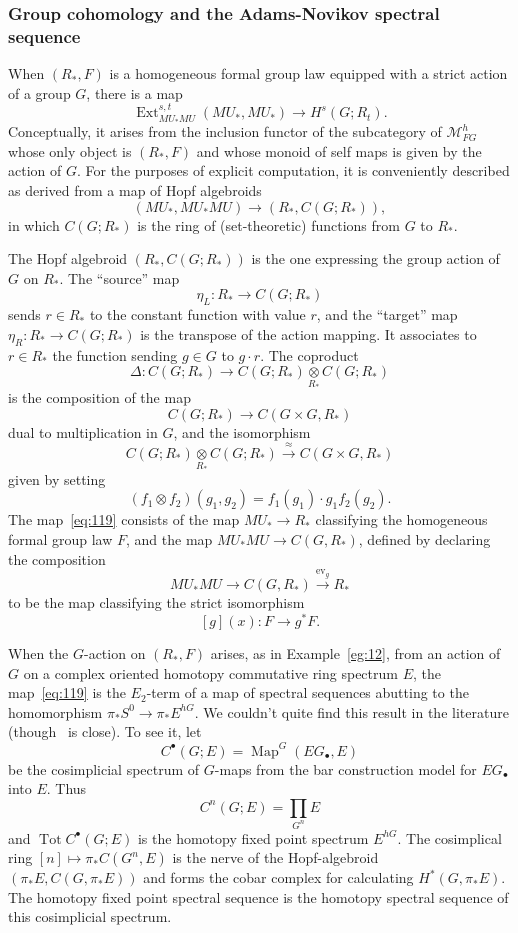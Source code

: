 \documentclass{amsart}
\theoremstyle{definition}
\theoremstyle{remark}
\newcommand{\ext}{\operatorname{Ext}}
\DeclareMathOperator{\map}{Map}
\DeclareMathOperator{\ev}{ev}
\newcommand{\mustarmu}{MU_{\ast}MU}
\newcommand{\mustar}{MU_{\ast}}
\newcommand{\mfgh}{\mathcal{M}_{FG}^{h}}
\DeclareMathOperator{\tot}{Tot}
\begin{document}
\subsubsection{Group cohomology and the Adams-Novikov spectral
sequence}
\label{sec:group-cohom-adams}
When $(R_{\ast},F)$ is a homogeneous formal group law equipped with a
strict action of a group $G$, there is a map
\[
\ext^{s,t}_{\mustarmu}(\mustar,\mustar) \to H^{s}(G;R_{t}).
\]
Conceptually, it arises from the inclusion functor of the subcategory
of $\mfgh$ whose only object is $(R_{\ast},F)$ and whose monoid of
self maps is given by the action of $G$.  For the purposes of explicit
computation, it is  conveniently described as derived from a map of
Hopf algebroids
\begin{equation}
\label{eq:119}
(\mustar,\mustarmu) \to (R_{\ast}, C(G;R_{\ast})),
\end{equation}
in which $C(G;R_{\ast})$ is the ring of (set-theoretic) functions from
$G$ to $R_{\ast}$. 

The Hopf algebroid $(R_{\ast}, C(G;R_{\ast}))$ is the one expressing
the group action of $G$ on $R_{\ast}$.  The ``source'' map
\[
\eta_{L}:R_{\ast}\to C(G;R_{\ast})
\]
sends $r\in R_{\ast}$ to the constant function with value $r$, and the
``target'' map $\eta_{R}:R_{\ast}\to C(G;R_{\ast})$ is the transpose
of the action mapping.  It associates to $r\in R_{\ast}$ the function
sending $g\in G$ to $g\cdot r$.  The coproduct
\[
\Delta:C(G;R_{\ast}) \to C(G;R_{\ast})\underset{R_{\ast}}{\otimes}
C(G;R_{\ast})
\]
is the composition of the map
\[
C(G;R_{\ast})\to C(G\times G,R_{\ast})
\]
dual to multiplication in $G$, and the isomorphism
\[
C(G;R_{\ast})\underset{R_{\ast}}{\otimes} C(G;R_{\ast}) 
\xrightarrow{\approx}{} C(G\times G,R_{\ast}) 
\]
given by setting
\[
(f_{1}\otimes f_{2})(g_{1},g_{2}) =f_{1}(g_{1})\cdot g_{1}f_{2}(g_{2}).
\]
The map~\eqref{eq:119} consists of the map $\mustar\to R_{\ast}$
classifying the homogeneous formal group law $F$, and the map
$\mustarmu\to C(G,R_{\ast})$, defined by declaring the composition
\[
\mustarmu\to C(G,R_{\ast})\xrightarrow{\ev_{g}}{} R_{\ast}
\]
to be the map classifying the strict isomorphism 
\[
[g](x):F\to g^{\ast}F.
\]

When the $G$-action on $(R_{\ast}, F)$ arises, as in
Example~\ref{eg:12}, from an action of $G$ on a complex oriented
homotopy commutative ring spectrum $E$, the map~\eqref{eq:119} is the
$E_{2}$-term of a map of spectral sequences abutting to the
homomorphism $\pi_{\ast}S^{0}\to \pi_{\ast}E^{hG}$.  We couldn't quite
find this result in the literature
(though~\cite[Proposition~6.7]{devinatz04:_homot_morav} is close).  To
see it, let
\[
C^{\bullet}(G;E) = \map^{G}(EG_{\bullet},E)
\]
be the cosimplicial spectrum of $G$-maps from the bar construction
model for $EG_{\bullet}$ into $E$.  Thus
\[
C^{n}(G;E) = \prod_{G^{n}}E
\]
and $\tot C^{\bullet}(G;E)$ is the homotopy fixed point spectrum
$E^{hG}$.  The cosimplical ring $[n]\mapsto \pi_{\ast}C(G^{n},E)$
is the nerve of the Hopf-algebroid $(\pi_{\ast}E,
C(G,\pi_{\ast}E))$ and forms the cobar complex for calculating
$H^{\ast}(G,\pi_{\ast}E)$.   The homotopy fixed point spectral
sequence is the homotopy spectral sequence of this cosimplicial
spectrum.   
\end{document}
